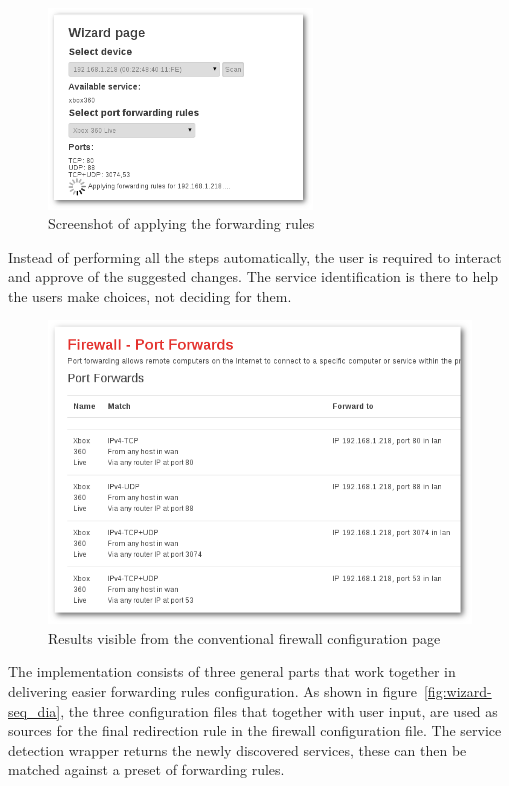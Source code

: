 \documentclass[a4paper,11pt,makeidx]{kth-bcs}
\begin{document}
\begin{figure}[h]
   \centering
   \includegraphics[width=7cm]{ss-applying-shadow}
   \caption{Screenshot of applying the forwarding rules}
   \label{fig:applying}
\end{figure}

Instead of performing all the steps automatically, the user is required to interact and approve of the suggested changes.
The service identification is there to help the users make choices, not deciding for them.

\begin{figure}[h]
   \centering
   \includegraphics[width=13cm]{ss-results-shadow.png}
   \caption{Results visible from the conventional firewall configuration page}
   \label{fig:scanning}
\end{figure}

The implementation consists of three general parts that work together in delivering easier forwarding rules configuration.
As shown in figure~\ref{fig:wizard-seq_dia}, the three configuration files that together with user input, are used as sources for the final redirection rule in the firewall configuration file.
The service detection wrapper returns the newly discovered services, these can then be matched against a preset of forwarding rules.
\end{document}
